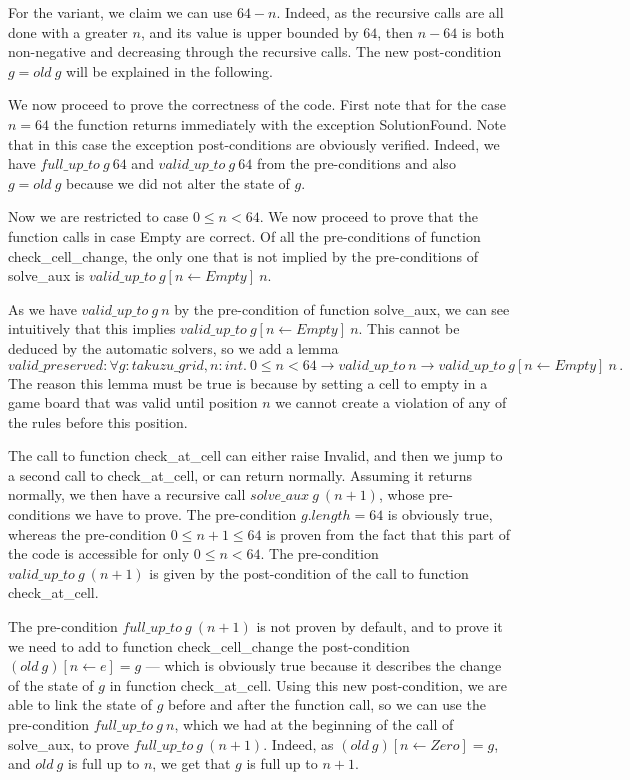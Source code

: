 \documentclass[]{StandardTemplate}
\begin{document}
For the variant, we claim we can use $ 64 - n $. Indeed, as the recursive calls are all done with a greater $ n $, and its value is upper bounded by $ 64 $, then $ n - 64 $ is both non-negative and decreasing through the recursive calls. The new post-condition $ g= old~g $ will be explained in the following.

We now proceed to prove the correctness of the code. First note that for the case $ n=64 $ the function returns immediately with the exception SolutionFound. Note that in this case the exception post-conditions are obviously verified. Indeed, we have $ full\_up\_to~g~64 $ and $ valid\_up\_to~g~64 $ from the pre-conditions and also $ g = old~g $ because we did not alter the state of $ g $.

Now we are restricted to case $ 0 \leq n < 64 $. We now proceed to prove that the function calls in case Empty are correct. Of all the pre-conditions of function check\_cell\_change, the only one that is not implied by the pre-conditions of solve\_aux is $ valid\_up\_to~g[n \leftarrow Empty]~n $.

As we have $  valid\_up\_to~g~n $ by the pre-condition of function solve\_aux, we can see intuitively that this implies $ valid\_up\_to~g[n \leftarrow Empty]~n $. This cannot be deduced by the automatic solvers, so we add a lemma \[
valid\_preserved : \forall g : takuzu\_grid, n : int.~0 \leq n < 64 \to valid\_up\_to~n \to valid\_up\_to~g[n \leftarrow Empty]~n
\,.\] The reason this lemma must be true is because by setting a cell to empty in a game board that was valid until position $ n $ we cannot create a violation of any of the rules before this position.

The call to function check\_at\_cell can either raise Invalid, and then we jump to a second call to check\_at\_cell, or can return normally. Assuming it returns normally, we then have a recursive call $solve\_aux~g~(n+1)$, whose pre-conditions we have to prove. The pre-condition $ g.length=64 $ is obviously true, whereas the pre-condition $ 0 \leq n+1 \leq 64 $ is proven from the fact that this part of the code is accessible for only $ 0 \leq n < 64 $. The pre-condition $ valid\_up\_to~g~(n+1) $ is given by the post-condition of the call to function check\_at\_cell.

The pre-condition $ full\_up\_to~g~(n+1) $ is not proven by default, and to prove it we need to add to function check\_cell\_change the post-condition $ (old~g)[n\leftarrow e] = g $ --- which is obviously true because it describes the change of the state of $ g $ in function check\_at\_cell. Using this new post-condition, we are able to link the state of $ g $ before and after the function call, so we can use the pre-condition $ full\_up\_to~g~n $, which we had at the beginning of the call of solve\_aux, to prove $ full\_up\_to~g~(n+1)$. Indeed, as $ (old~g)[n \leftarrow Zero] = g $, and $ old~g $ is full up to $ n $, we get that $ g $ is full up to $ n + 1$. 
\end{document}

